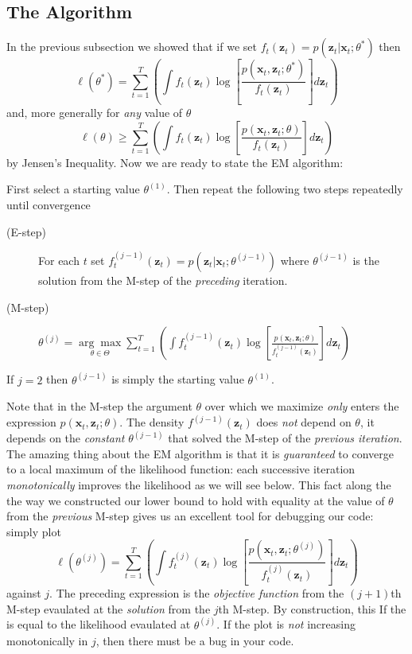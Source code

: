 \subsection{The Algorithm}
In the previous subsection we showed that if we set $f_t(\mathbf{z}_t) = p(\textbf{z}_t|\textbf{x}_t;\theta^*)$ then
	$$\ell(\theta^*) = \sum_{t = 1}^T  \left(\int f_t(\mathbf{z}_t) \log\left[\frac{p(\textbf{x}_t,\textbf{z}_t;\theta^*)}{f_t(\mathbf{z}_t)}\right] d \textbf{z}_t \right)$$
and, more generally for \emph{any} value of $\theta$
	$$\ell(\theta) \geq \sum_{t = 1}^T  \left(\int f_t(\mathbf{z}_t) \log\left[\frac{p(\textbf{x}_t,\textbf{z}_t;\theta)}{f_t(\mathbf{z}_t)}\right] d \textbf{z}_t \right)$$
by Jensen's Inequality. Now we are ready to state the EM algorithm:
\begin{alg}[EM Algorithm]
First select a starting value $\theta^{(1)}$. Then repeat the following two steps repeatedly until convergence
			\begin{description}
			 	\item[(E-step)] For each $t$ set $f_t^{(j-1)}(\mathbf{z}_t) = p(\mathbf{z}_t|\mathbf{x}_t; \theta^{(j-1)})$ where $\theta^{(j-1)}$ is the solution from the M-step of the \emph{preceding} iteration. 
			 	\item[(M-step)] 
			 		$\displaystyle\theta^{(j)} = \underset{\theta \in \Theta}{\arg \max} \sum_{t = 1}^T  \left(\int f_t^{(j-1)}(\mathbf{z}_t) \log\left[\frac{p(\textbf{x}_t,\textbf{z}_t;\theta)}{f_t^{(j-1)}(\mathbf{z}_t)}\right] d \textbf{z}_t \right)$
			 \end{description}
If $j = 2$ then $\theta^{(j-1)}$ is simply the starting value $\theta^{(1)}$.
\end{alg}
Note that in the M-step the argument $\theta$ over which we maximize \emph{only} enters the expression $p(\textbf{x}_t,\textbf{z}_t;\theta)$. The density $f^{(j-1)}(\mathbf{z}_t)$ does \emph{not} depend on $\theta$, it depends on the \emph{constant} $\theta^{(j-1)}$ that solved the M-step of the \emph{previous iteration}. The amazing thing about the EM algorithm is that it is \emph{guaranteed} to converge to a local maximum of the likelihood function: each successive iteration \emph{monotonically} improves the likelihood as we will see below. This fact along the the way we constructed our lower bound to hold with equality at the value of $\theta$ from the \emph{previous} M-step gives us an excellent tool for debugging our code: simply plot
	$$\ell(\theta^{(j)}) = \sum_{t = 1}^T  \left(\int f_t^{(j)}(\mathbf{z}_t) \log\left[\frac{p(\textbf{x}_t,\textbf{z}_t;\theta^{(j)})}{f_t^{(j)}(\mathbf{z}_t)}\right] d \textbf{z}_t \right)$$ 
against $j$. The preceding expression is the \emph{objective function} from the $(j+1)$th M-step evaulated at the \emph{solution} from the $j$th M-step. By construction, this If the is equal to the likelihood evaulated at $\theta^{(j)}$. If the plot is \emph{not} increasing monotonically in $j$, then there must be a bug in your code.

